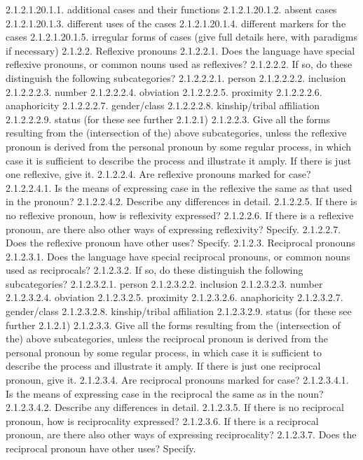 2.1.2.1.20.1.1. additional cases and their functions
2.1.2.1.20.1.2. absent cases
2.1.2.1.20.1.3. different uses of the cases
2.1.2.1.20.1.4. different markers for the cases
2.1.2.1.20.1.5. irregular forms of cases (give full details here, with paradigms if necessary)
2.1.2.2. Reflexive pronouns
2.1.2.2.1. Does the language have special reflexive pronouns, or common nouns used as reflexives?
2.1.2.2.2. If so, do these distinguish the following subcategories?
2.1.2.2.2.1. person
2.1.2.2.2.2. inclusion
2.1.2.2.2.3. number
2.1.2.2.2.4. obviation
2.1.2.2.2.5. proximity
2.1.2.2.2.6. anaphoricity
2.1.2.2.2.7. gender/class
2.1.2.2.2.8. kinship/tribal affiliation
2.1.2.2.2.9. status (for these see further 2.1.2.1)
2.1.2.2.3. Give all the forms resulting from the (intersection of the) above subcategories, unless the reflexive pronoun is derived from the personal pronoun by some regular process, in which case it is sufficient to describe the process and illustrate it amply. If there is just one reflexive, give it.
2.1.2.2.4. Are reflexive pronouns marked for case?
2.1.2.2.4.1. Is the means of expressing case in the reflexive the same as that used in the pronoun?
2.1.2.2.4.2. Describe any differences in detail.
2.1.2.2.5. If there is no reflexive pronoun, how is reflexivity expressed?
2.1.2.2.6. If there is a reflexive pronoun, are there also other ways of expressing reflexivity? Specify.
2.1.2.2.7. Does the reflexive pronoun have other uses? Specify.
2.1.2.3. Reciprocal pronouns
2.1.2.3.1. Does the language have special reciprocal pronouns, or common nouns used as reciprocals?
2.1.2.3.2. If so, do these distinguish the following subcategories?
2.1.2.3.2.1. person
2.1.2.3.2.2. inclusion
2.1.2.3.2.3. number
2.1.2.3.2.4. obviation
2.1.2.3.2.5. proximity
2.1.2.3.2.6. anaphoricity
2.1.2.3.2.7. gender/class
2.1.2.3.2.8. kinship/tribal affiliation
2.1.2.3.2.9. status (for these see further 2.1.2.1)
2.1.2.3.3. Give all the forms resulting from the (intersection of the) above subcategories, unless the reciprocal pronoun is derived from the personal pronoun by some regular process, in which case it is sufficient to describe the process and illustrate it amply. If there is just one reciprocal pronoun, give it.
2.1.2.3.4. Are reciprocal pronouns marked for case?
2.1.2.3.4.1. Is the means of expressing case in the reciprocal the same as in the noun?
2.1.2.3.4.2. Describe any differences in detail.
2.1.2.3.5. If there is no reciprocal pronoun, how is reciprocality expressed?
2.1.2.3.6. If there is a reciprocal pronoun, are there also other ways of expressing reciprocality?
2.1.2.3.7. Does the reciprocal pronoun have other uses? Specify.
